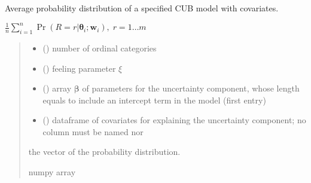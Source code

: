 \documentclass[letterpaper,10pt,english]{sphinxmanual}
\begin{document}
\begin{fulllineitems}
\label{\detokenize{cubmods:cubmods.cub_y0.pmf}}
\pysigstartsignatures
{}
\pysigstopsignatures
\sphinxAtStartPar
Average probability distribution of a specified CUB model 
with covariates.

\sphinxAtStartPar
\(\frac{1}{n} \sum_{i=1}^n \Pr(R = r | \pmb\theta_i ; \pmb w_i),\; r=1 \ldots m\)
\begin{quote}\begin{description}
\begin{itemize}
\item {} 
\sphinxAtStartPar
{} () \textendash{} number of ordinal categories

\item {} 
\sphinxAtStartPar
{} () \textendash{} feeling parameter \(\xi\)

\item {} 
\sphinxAtStartPar
{} () \textendash{} array \(\pmb \beta\) of parameters for the uncertainty component, whose length equals 
 to include an intercept term in the model (first entry)

\item {} 
\sphinxAtStartPar
{} () \textendash{} dataframe of covariates for explaining the uncertainty component;
no column must be named  nor 

\end{itemize}

\sphinxAtStartPar
the vector of the probability distribution.

\sphinxAtStartPar
numpy array

\end{description}\end{quote}

\end{fulllineitems}
\end{document}

